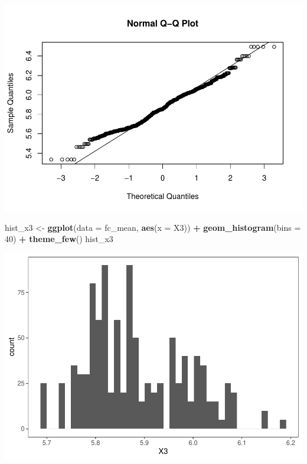 \documentclass[]{article}
\newenvironment{Shaded}{\begin{snugshade}}{\end{snugshade}}
\newcommand{\DataTypeTok}[1]{\textcolor[rgb]{0.13,0.29,0.53}{#1}}
\newcommand{\DecValTok}[1]{\textcolor[rgb]{0.00,0.00,0.81}{#1}}
\newcommand{\KeywordTok}[1]{\textcolor[rgb]{0.13,0.29,0.53}{\textbf{#1}}}
\newcommand{\NormalTok}[1]{#1}
\newcommand{\OperatorTok}[1]{\textcolor[rgb]{0.81,0.36,0.00}{\textbf{#1}}}
\newcommand{\StringTok}[1]{\textcolor[rgb]{0.31,0.60,0.02}{#1}}
\begin{document}
\includegraphics{Econo2_P4_files/figure-latex/mean ic-4.pdf}

\begin{Shaded}
\begin{Highlighting}[]
\NormalTok{hist_x3 <-}\StringTok{ }\KeywordTok{ggplot}\NormalTok{(}\DataTypeTok{data =}\NormalTok{ fc_mean, }\KeywordTok{aes}\NormalTok{(}\DataTypeTok{x =}\NormalTok{ X3)) }\OperatorTok{+}\StringTok{ }\KeywordTok{geom_histogram}\NormalTok{(}\DataTypeTok{bins =} \DecValTok{40}\NormalTok{) }\OperatorTok{+}\StringTok{ }\KeywordTok{theme_few}\NormalTok{() }
\NormalTok{hist_x3}
\end{Highlighting}
\end{Shaded}

\includegraphics{Econo2_P4_files/figure-latex/mean ic-5.pdf}

\begin{Shaded}
\end{Shaded}
\end{document}
